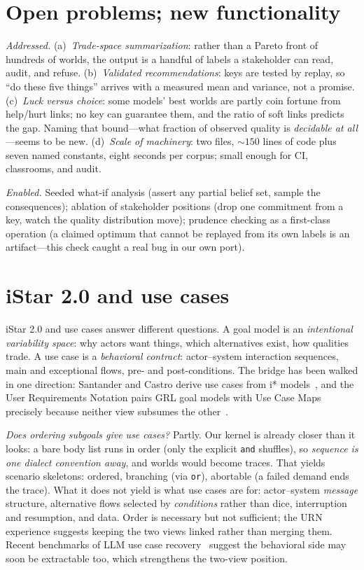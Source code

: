 \documentclass[sigconf,nonacm]{acmart}
\begin{document}
\section{Open problems; new functionality}

\emph{Addressed.} (a)~\emph{Trade-space summarization}: rather
than a Pareto front of hundreds of worlds, the output is a
handful of labels a stakeholder can read, audit, and refuse.
(b)~\emph{Validated recommendations}: keys are tested by
replay, so ``do these five things'' arrives with a measured
mean and variance, not a promise. (c)~\emph{Luck versus
choice}: some models' best worlds are partly coin fortune from
help/hurt links; no key can guarantee them, and the ratio of
soft links predicts the gap. Naming that bound---what fraction
of observed quality is \emph{decidable at all}---seems to be
new. (d)~\emph{Scale of machinery}: two files, ${\sim}150$
lines of code plus seven named constants, eight seconds per
corpus; small enough for CI, classrooms, and audit.

\emph{Enabled.} Seeded what-if analysis (assert any partial
belief set, sample the consequences); ablation of stakeholder
positions (drop one commitment from a key, watch the quality
distribution move); prudence checking as a first-class
operation (a claimed optimum that cannot be replayed from its
own labels is an artifact---this check caught a real bug in
our own port).

\section{iStar 2.0 and use cases}

iStar 2.0 and use cases answer different questions. A goal
model is an \emph{intentional variability space}: why actors
want things, which alternatives exist, how qualities trade.
A use case is a \emph{behavioral contract}: actor--system
interaction sequences, main and exceptional flows, pre- and
post-conditions. The bridge has been walked in one direction:
Santander and Castro derive use cases from i*
models~\cite{santander02}, and the User Requirements Notation
pairs GRL goal models with Use Case Maps precisely because
neither view subsumes the other~\cite{amyot10}.

\emph{Does ordering subgoals give use cases?} Partly. Our
kernel is already closer than it looks: a bare body list runs
in order (only the explicit \verb|and| shuffles), so
\emph{sequence is one dialect convention away}, and worlds
would become traces. That yields scenario skeletons: ordered,
branching (via \verb|or|), abortable (a failed demand ends the
trace). What it does not yield is what use cases are for:
actor--system \emph{message} structure, alternative flows
selected by \emph{conditions} rather than dice, interruption
and resumption, and data. Order is necessary but not
sufficient; the URN experience suggests keeping the two views
linked rather than merging them. Recent benchmarks of LLM use
case recovery~\cite{ucrbench25} suggest the behavioral side may
soon be extractable too, which strengthens the two-view
position.
\end{document}
